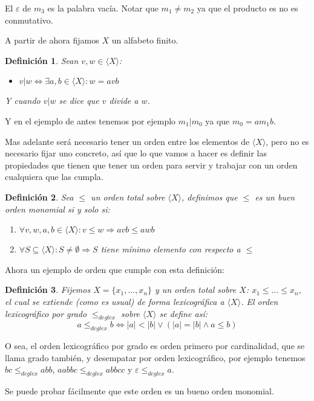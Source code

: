 \documentclass{amsbook} %
\theoremstyle{customstyle}
\newtheorem{definition}{Definición}[chapter]
\theoremstyle{factstyle}
\begin{document}
El $ε$ de $m_3$ es la palabra vacía. Notar que $m_1 ≠ m_2$ ya que el producto es no es conmutativo.

A partir de ahora fijamos $X$ un alfabeto finito.

\begin{definition}
Sean $v, w ∈ ⟨X⟩$:
\begin{itemize}
\item $v | w ⇔ ∃a , b ∈ ⟨X⟩ : w = avb$
\end{itemize}

Y cuando $v | w$ se dice que $v$ divide a $w$.
\end{definition}

Y en el ejemplo de antes tenemos por ejemplo $m_1 | m_0$ ya que $m_0 = a m_1 b$.

Mas adelante será necesario tener un orden entre los elementos de $⟨X⟩$, pero no es necesario fijar uno concreto, así que lo que vamos a hacer es definir las propiedades que tienen que tener un orden para servir y trabajar con un orden cualquiera que las cumpla.

\begin{definition}
Sea $≤$ un orden total sobre $⟨X⟩$, definimos que $≤$ es un buen orden monomial si y solo si:
\begin{enumerate}
\item $∀v, w, a, b ∈ ⟨X⟩ : v ≤ w ⇒ avb ≤ awb$

\item $∀S ⊆ ⟨X⟩ : S ≠ ∅ ⇒ S$ tiene mínimo elemento con respecto a $≤$
\end{enumerate}
\end{definition}

Ahora un ejemplo de orden que cumple con esta definición:

\begin{definition}
Fijemos $X = \{x_1, …, x_n\}$ y un orden total sobre $X$: $x_1 ≤ … ≤ x_n$, el cual se extiende (como es usual) de forma lexicográfica a $⟨X⟩$. El orden lexicográfico por grado $ ≤_{deglex}$ sobre $⟨X⟩$ se define así:
\[ a ≤_{deglex} b ⇔ |a| < |b| ∨ (|a| = |b| ∧ a ≤ b) \]
\end{definition}

O sea, el orden lexicográfico por grado es orden primero por cardinalidad, que se llama grado también, y desempatar por orden lexicográfico, por ejemplo tenemos $bc ≤_{deglex} abb$, $aabbc ≤_{deglex} abbcc$ y $ε ≤_{deglex} a$.

Se puede probar fácilmente que este orden es un bueno orden monomial.
\end{document}
